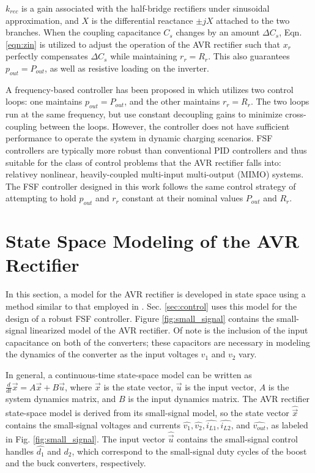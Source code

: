 \documentclass[journal, onecolumn, final, letterpaper, 11pt]{IEEEtran}
\begin{document}
$k_{rec}$ is a gain associated with the half-bridge rectifiers under sinusoidal approximation, and $X$ is the differential reactance $\pm jX$ attached to the two branches. When the coupling capacitance $C_s$ changes by an amount $\Delta C_s$, Eqn. \ref{eqn:zin} is utilized to adjust the operation of the AVR rectifier such that $x_r$ perfectly compensates $\Delta C_s$ while maintaining $r_r = R_r$. This also guarantees $p_{out} = P_{out}$, as well as resistive loading on the inverter.

A frequency-based controller has been proposed in \cite{2024_Maji_COMPEL} which utilizes two control loops: one maintains $p_{out} = P_{out}$, and the other maintains $r_r = R_r$. The two loops run at the same frequency, but use constant decoupling gains to minimize cross-coupling between the loops. However, the controller does not have sufficient performance to operate the system in dynamic charging scenarios. FSF controllers are typically more robust than conventional PID controllers and thus suitable for the class of control problems that the AVR rectifier falls into: relativey nonlinear, heavily-coupled multi-input multi-output (MIMO) systems. The FSF controller designed in this work follows the same control strategy of attempting to hold $p_{out}$ and $r_r$ constant at their nominal values $P_{out}$ and $R_r$.

\section{State Space Modeling of the AVR Rectifier}
\label{sec:modeling}

In this section, a model for the AVR rectifier is developed in state space using a method similar to that employed in \cite{2010_Mayo_CONIELECOMP}. Sec. \ref{sec:control} uses this model for the design of a robust FSF controller. Figure \ref{fig:small_signal} contains the small-signal linearized model of the AVR rectifier. Of note is the inclusion of the input capacitance on both of the converters; these capacitors are necessary in modeling the dynamics of the converter as the input voltages $v_1$ and $v_2$ vary.

In general, a continuous-time state-space model can be written as $\frac{d}{dt}\vec{x} = A\vec{x} + B\vec{u}$, where $\vec{x}$ is the state vector, $\vec{u}$ is the input vector, $A$ is the system dynamics matrix, and $B$ is the input dynamics matrix. The AVR rectifier state-space model is derived from its small-signal model, so the state vector $\widehat{\vec{x}}$ contains the small-signal voltages and currents $\widehat{v_1}, \widehat{v_2}, \widehat{i_{L1}}, \widehat{i_{L2}}$, and $\widehat{v_{out}}$, as labeled in Fig. \ref{fig:small_signal}. The input vector $\widehat{\vec{u}}$ contains the small-signal control handles $\widehat{d_1}$ and $\widehat{d_2}$, which correspond to the small-signal duty cycles of the boost and the buck converters, respectively.
\end{document}
